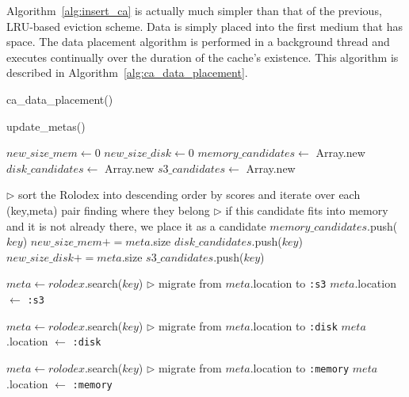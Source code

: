Algorithm~\ref{alg:insert_ca} is actually much simpler than that of the
previous, LRU-based eviction scheme. Data is simply placed into the first
medium that has space. The data placement algorithm is performed in a
background thread and executes continually over the duration of the cache's
existence.  This algorithm is described in
Algorithm~\ref{alg:ca_data_placement}.

\begin{algorithm}[htp]
\small
\caption{\label{alg:ca_data_placement}ca\_data\_placement()}
\begin{algorithmic}[1]
	\STATE update\_metas()

	\STATE $new\_size\_mem \leftarrow 0$
	\STATE $new\_size\_disk \leftarrow 0$
	\STATE $memory\_candidates \leftarrow$ Array.new
	\STATE $disk\_candidates \leftarrow$ Array.new
	\STATE $s3\_candidates \leftarrow$ Array.new

	\STATE $\triangleright$ sort the Rolodex into descending order by scores and
	iterate over each (key,meta) pair finding where they belong
		\STATE $\triangleright$ if this candidate fits into memory and it is not
		already there, we place it as a candidate
				\STATE $memory\_candidates$.push($key$)
			\ENDIF
			\STATE $new\_size\_mem += meta$.size
				\STATE $disk\_candidates$.push($key$)
			\ENDIF
			\STATE $new\_size\_disk += meta$.size
		\ELSE
				\STATE $s3\_candidates$.push($key$)
			\ENDIF
		\ENDIF
	\ENDFOR

		\STATE $meta \leftarrow rolodex$.search($key$)
		\STATE $\triangleright$ migrate from $meta$.location to {\tt :s3}
		\STATE $meta$.location $\leftarrow$ {\tt :s3}
	\ENDFOR
	
		\STATE $meta \leftarrow rolodex$.search($key$)
		\STATE $\triangleright$ migrate from $meta$.location to {\tt :disk}
		\STATE $meta$.location $\leftarrow$ {\tt :disk}
	\ENDFOR

		\STATE $meta \leftarrow rolodex$.search($key$)
		\STATE $\triangleright$ migrate from $meta$.location to {\tt :memory}
		\STATE $meta$.location $\leftarrow$ {\tt :memory}
	\ENDFOR
\ENDWHILE
\end{algorithmic}
\end{algorithm}

